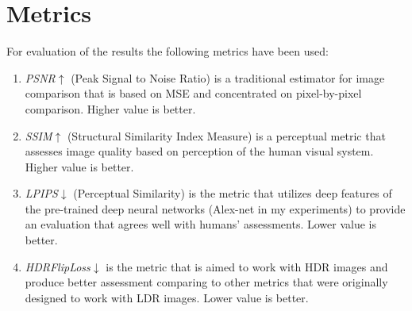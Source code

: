 






\section{Metrics}

For evaluation of the results the following metrics have been used:
\begin{enumerate}
    \item \textit{PSNR}$\uparrow$ \cite{hore2010image} (Peak Signal to Noise Ratio) is a traditional estimator for image comparison
    that is based on MSE and concentrated on pixel-by-pixel comparison.
    Higher value is better.
    \item \textit{SSIM}$\uparrow$ \cite{zhou2004image, nilsson2020understanding, hore2010image} (Structural Similarity Index Measure) is a perceptual metric
    that assesses image quality based on perception of the human visual system.
    Higher value is better.
    \item \textit{LPIPS}$\downarrow$ \cite{zhang2018perceptual} (Perceptual Similarity) is the metric
    that utilizes deep features of the pre-trained deep neural networks (Alex-net \cite{krizhevsky2012imagenet} in my experiments)
    to provide an evaluation that agrees well with humans' assessments.
    Lower value is better.
    \item \textit{HDRFlipLoss}$\downarrow$ \cite{theisel2021hdrflip, andersson2020flip} is the metric
    that is aimed to work with HDR images and produce better assessment comparing to other metrics
    that were originally designed to work with LDR images.
    Lower value is better.
\end{enumerate}

